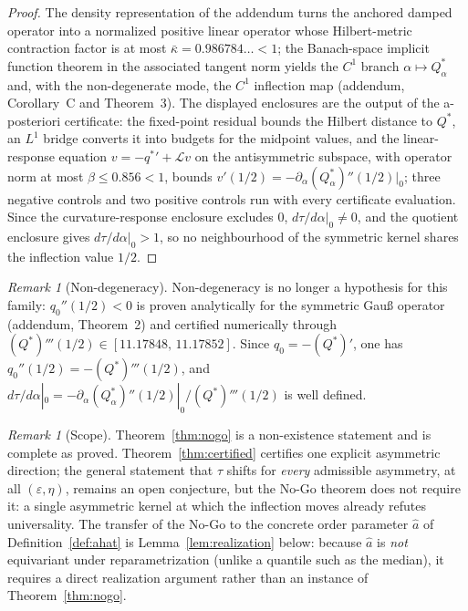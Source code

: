 \documentclass[11pt]{article}
\theoremstyle{plain}
\theoremstyle{definition}
\theoremstyle{remark}
\newtheorem{remark}[theorem]{Remark}
\begin{document}
\begin{proof}
The density representation of the addendum turns the anchored damped operator into a normalized positive linear operator whose Hilbert-metric contraction factor is at most $\bar\kappa=0.986784\ldots<1$; the Banach-space implicit function theorem in the associated tangent norm yields the $C^1$ branch $\alpha\mapsto Q^*_\alpha$ and, with the non-degenerate mode, the $C^1$ inflection map (addendum, Corollary~C and Theorem~3). The displayed enclosures are the output of the a-posteriori certificate: the fixed-point residual bounds the Hilbert distance to $Q^*$, an $L^1$ bridge converts it into budgets for the midpoint values, and the linear-response equation $v=-{q^*}'+\mathcal Lv$ on the antisymmetric subspace, with operator norm at most $\beta\le0.856<1$, bounds $v'(1/2)=-\partial_\alpha(Q^*_\alpha)''(1/2)|_0$; three negative controls and two positive controls run with every certificate evaluation. Since the curvature-response enclosure excludes $0$, $d\tau/d\alpha|_0\neq0$, and the quotient enclosure gives $d\tau/d\alpha|_0>1$, so no neighbourhood of the symmetric kernel shares the inflection value $1/2$.
\end{proof}

\begin{remark}[Non-degeneracy]
Non-degeneracy is no longer a hypothesis for this family: $q_0''(1/2)<0$ is proven analytically for the symmetric Gau{\ss} operator (addendum, Theorem~2) and certified numerically through $(Q^*)'''(1/2)\in[11.17848,\,11.17852]$. Since $q_0=-(Q^*)'$, one has $q_0''(1/2)=-(Q^*)'''(1/2)$, and $d\tau/d\alpha|_0=-\partial_\alpha(Q^*_\alpha)''(1/2)|_0/(Q^*)'''(1/2)$ is well defined.
\end{remark}

\begin{remark}[Scope]
Theorem~\ref{thm:nogo} is a non-existence statement and is complete as proved. Theorem~\ref{thm:certified} certifies one explicit asymmetric direction; the general statement that $\tau$ shifts for \emph{every} admissible asymmetry, at all $(\varepsilon,\eta)$, remains an open conjecture, but the No-Go theorem does not require it: a single asymmetric kernel at which the inflection moves already refutes universality. The transfer of the No-Go to the concrete order parameter $\hat a$ of Definition~\ref{def:ahat} is Lemma~\ref{lem:realization} below: because $\hat a$ is \emph{not} equivariant under reparametrization (unlike a quantile such as the median), it requires a direct realization argument rather than an instance of Theorem~\ref{thm:nogo}.
\end{remark}
\end{document}
